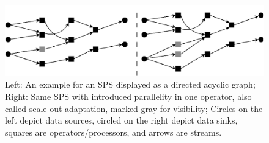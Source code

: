         \begin{figure}[h]
            \centering
            \includegraphics[width=1.0\textwidth]{Bilder/sps_parallel_normal.png}
            \caption{
                    Left: An example for an SPS displayed as a directed acyclic graph;
                    Right: Same SPS with introduced parallelity in one operator, also called scale-out adaptation, marked gray for visibility;
                    Circles on the left depict data sources, circled on the right depict data sinks, squares are operators/processors, and arrows are streams.
            }
            \label{fig:sps_parallel_normal}
        \end{figure}

        


        
